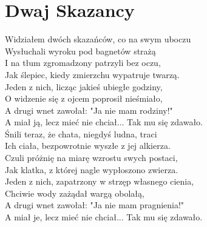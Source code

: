 \section{Dwaj Skazancy}
\begin{text}
    Widziałem dwóch skazańców, co na swym uboczu\\
    Wysłuchali wyroku pod bagnetów strażą\\
    I na tłum zgromadzony patrzyli bez oczu,\\
    Jak ślepiec, kiedy zmierzchu wypatruje twarzą.\\
    Jeden z nich, licząc jakieś ubiegłe godziny,\\
    O widzenie się z ojcem poprosił nieśmiało,\\
    A drugi wnet zawołał: "Ja nie mam rodziny!"\\
    A miał ją, lecz mieć nie chciał... Tak mu się zdawało.\\

    Śnili teraz, że chata, niegdyś ludna, traci\\
    Ich ciała, bezpowrotnie wyszłe z jej alkierza.\\
    Czuli próżnię na miarę wzrostu swych postaci,\\
    Jak klatka, z której nagle wypłoszono zwierza.\\
    Jeden z nich, zapatrzony w strzęp własnego cienia,\\
    Chciwie wody zażądał wargą obolałą,\\
    A drugi wnet zawołał: "Ja nie mam pragnienia!"\\
    A miał je, lecz mieć nie chciał... Tak mu się zdawało.
\end{text}
